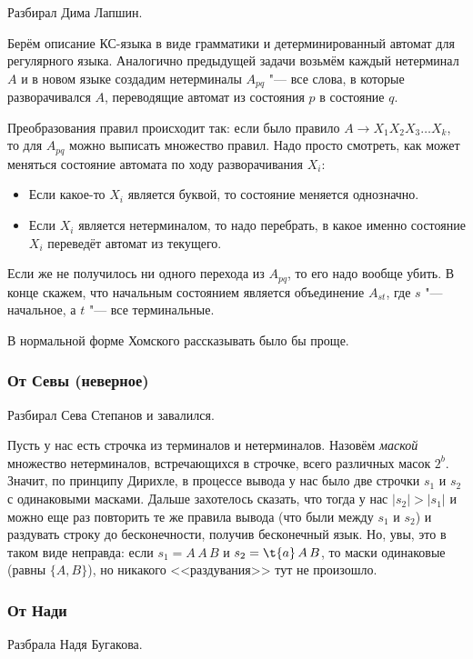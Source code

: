 	Разбирал Дима Лапшин.

	Берём описание КС-языка в виде грамматики и детерминированный автомат для регулярного языка.
	Аналогично предыдущей задачи возьмём каждый нетерминал $A$ и в новом языке создадим
	нетерминалы $A_{pq}$ "--- все слова, в которые разворачивался $A$, переводящие автомат
	из состояния $p$ в состояние $q$.

	Преобразования правил происходит так: если было правило $A \to X_1X_2X_3\dots X_k$, то для $A_{pq}$ можно выписать множество правил.
	Надо просто смотреть, как может меняться состояние автомата по ходу разворачивания $X_i$:
	\begin{itemize}
		\item
			Если какое-то $X_i$ является буквой, то состояние меняется однозначно.
		\item
			Если $X_i$ является нетерминалом, то надо перебрать, в какое именно состояние $X_i$ переведёт автомат из текущего.
	\end{itemize}
	Если же не получилось ни одного перехода из $A_{pq}$, то его надо вообще убить.
	В конце скажем, что начальным состоянием является объединение $A_{st}$, где $s$ "--- начальное, а $t$ "--- все терминальные.

	\begin{Rem}
		В нормальной форме Хомского рассказывать было бы проще.
	\end{Rem}

	\subsubsection{От Севы (неверное)}
		Разбирал Сева Степанов и завалился.

		Пусть у нас есть строчка из терминалов и нетерминалов.
		Назовём \textit{маской} множество нетерминалов, встречающихся в строчке,
		всего различных масок $2^b$.
		Значит, по принципу Дирихле, в процессе вывода у нас было две строчки $s_1$ и $s_2$ с одинаковыми масками.
		Дальше захотелось сказать, что тогда у нас $|s_2|>|s_1|$ и можно еще раз повторить
		те же правила вывода (что были между $s_1$ и $s_2$) и раздувать строку до бесконечности, получив бесконечный язык.
		Но, увы, это в таком виде неправда: если $s_1=A\,A\,B$ и $s_2=\t{a}\,A\,B$, то маски одинаковые (равны $\{A, B\}$),
		но никакого <<раздувания>> тут не произошло.

	\subsubsection{От Нади}
		Разбрала Надя Бугакова.

